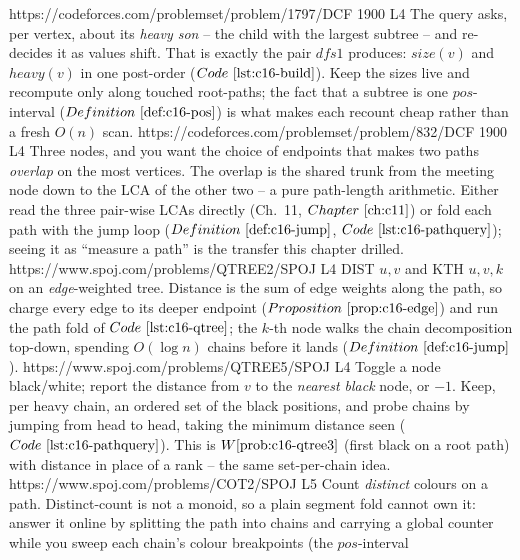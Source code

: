 \begin{mixedset}
    {https://codeforces.com/problemset/problem/1797/D}{CF 1900 L4}
    {The query asks, per vertex, about its \emph{heavy son} -- the child with the largest
     subtree -- and re-decides it as values shift. That is exactly the pair \(\mathit{dfs1}\)
     produces: \(\mathit{size}(v)\) and \(\mathit{heavy}(v)\) in one post-order
     (\(\coderef{c16-build}\)). Keep the sizes live and recompute only along touched root-paths;
     the fact that a subtree is one \(\mathit{pos}\)-interval (\(\defref{c16-pos}\)) is what makes
     each recount cheap rather than a fresh \(O(n)\) scan.}
    {https://codeforces.com/problemset/problem/832/D}{CF 1900 L4}
    {Three nodes, and you want the choice of endpoints that makes two paths \emph{overlap} on the
     most vertices. The overlap is the shared trunk from the meeting node down to the LCA of the
     other two -- a pure path-length arithmetic. Either read the three pair-wise LCAs directly
     (Ch.~11, \(\chref{c11}\)) or fold each path with the jump loop
     (\(\defref{c16-jump}\), \(\coderef{c16-pathquery}\)); seeing it as ``measure a path'' is the
     transfer this chapter drilled.}
    {https://www.spoj.com/problems/QTREE2/}{SPOJ L4}
    {DIST \(u,v\) and KTH \(u,v,k\) on an \emph{edge}-weighted tree. Distance is the sum of edge
     weights along the path, so charge every edge to its deeper endpoint (\(\propref{c16-edge}\))
     and run the path fold of \(\coderef{c16-qtree}\); the \(k\)-th node walks the chain
     decomposition top-down, spending \(O(\log n)\) chains before it lands
     (\(\defref{c16-jump}\)).}
    {https://www.spoj.com/problems/QTREE5/}{SPOJ L4}
    {Toggle a node black/white; report the distance from \(v\) to the \emph{nearest black} node,
     or \(-1\). Keep, per heavy chain, an ordered set of the black positions, and probe chains by
     jumping from head to head, taking the minimum distance seen (\(\coderef{c16-pathquery}\)).
     This is \(\probref{c16-qtree3}\) (first black on a root path) with distance in place of a
     rank -- the same set-per-chain idea.}
    {https://www.spoj.com/problems/COT2/}{SPOJ L5}
    {Count \emph{distinct} colours on a path. Distinct-count is not a monoid, so a plain segment
     fold cannot own it: answer it online by splitting the path into chains and carrying a global
     counter while you sweep each chain's colour breakpoints (the \(\mathit{pos}\)-interval
}
\end{mixedset}
